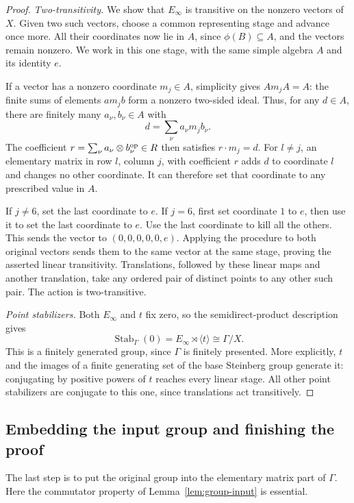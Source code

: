 \begin{proof}
\emph{Two-transitivity.}
We show that $E_\infty$ is transitive on the nonzero vectors of $X$.
Given two such vectors, choose a common representing stage and advance
once more.  All their coordinates now lie in $A$, since
$\phi(B)\subseteq A$, and the vectors remain nonzero.  We work in this
one stage, with the same simple algebra $A$ and its identity $e$.

If a vector has a nonzero coordinate $m_j\in A$, simplicity gives
$A m_j A=A$: the finite sums of elements $a m_j b$ form a nonzero
two-sided ideal.  Thus, for any $d\in A$, there are finitely many
$a_\nu,b_\nu\in A$ with
\[
 d=\sum_\nu a_\nu m_j b_\nu.
\]
The coefficient $r=\sum_\nu a_\nu\otimes b_\nu^{\mathrm{op}}\in R$ then
satisfies $r\cdot m_j=d$.  For $l\ne j$, an elementary matrix in row
$l$, column $j$, with coefficient $r$ adds $d$ to coordinate $l$ and
changes no other coordinate.  It can therefore set that coordinate to
any prescribed value in $A$.

If $j\ne6$, set the last coordinate to $e$.  If $j=6$, first set
coordinate $1$ to $e$, then use it to set the last coordinate to $e$.
Use the last coordinate to kill all the others.  This sends the vector
to $(0,0,0,0,0,e)$.  Applying the procedure to both original vectors
sends them to the same vector at the same stage, proving the asserted
linear transitivity.  Translations, followed by these linear maps and
another translation, take any ordered pair of distinct points to any
other such pair.  The action is two-transitive.

\emph{Point stabilizers.}
Both $E_\infty$ and $t$ fix zero, so the semidirect-product description
gives
\[
 \operatorname{Stab}_\Gamma(0)=E_\infty\rtimes\langle t\rangle
 \cong\Gamma/X.
\]
This is a finitely generated group, since $\Gamma$ is finitely
presented.  More explicitly, $t$ and the images of a finite generating
set of the base Steinberg group generate it: conjugating by positive
powers of $t$ reaches every linear stage.  All other point stabilizers
are conjugate to this one, since translations act transitively.
\end{proof}

\subsection{Embedding the input group and finishing the proof}

The last step is to put the original group into the elementary matrix
part of $\Gamma$.  Here the commutator property of
Lemma~\ref{lem:group-input} is essential.

